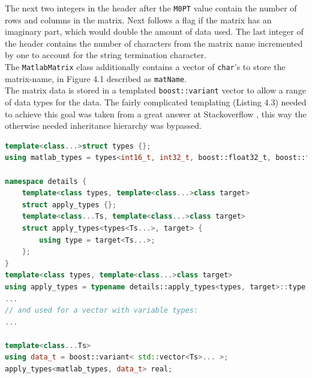 The next two integers in the header after the \texttt{M0PT} value contain the number of rows and columns in the matrix. Next follows a flag if the matrix has an imaginary part, which would double the amount of data used. The last integer of the header contains the number of characters from the matrix name incremented by one to account for the string termination character.\\
The \texttt{MatlabMatrix} class additionally contains a vector of \texttt{char}'s to store the matrix-name, in Figure 4.1 described as \texttt{matName}.\\
The matrix data is stored in a templated \texttt{boost::variant} vector to allow a range of data types for the data. The fairly complicated templating (Listing 4.3) needed to achieve this goal was taken from  a great answer at Stackoverflow \cite{stackof}, this way the otherwise needed inheritance hierarchy was bypassed. 

\begin{lstlisting}[language=C++, caption=A code snippet showing the templating to allow various types in a Boost variant.]
template<class...>struct types {};
using matlab_types = types<int16_t, int32_t, boost::float32_t, boost::float64_t, uint8_t, uint16_t>;

namespace details {
    template<class types, template<class...>class target>
    struct apply_types {};
    template<class...Ts, template<class...>class target>
    struct apply_types<types<Ts...>, target> {
        using type = target<Ts...>;
    };
}
template<class types, template<class...>class target>
using apply_types = typename details::apply_types<types, target>::type;
...
// and used for a vector with variable types:
...

template<class...Ts>
using data_t = boost::variant< std::vector<Ts>... >;
apply_types<matlab_types, data_t> real;
\end{lstlisting}

